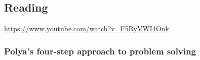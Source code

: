 



\subsection*{Reading}
\begin{center}
\begin{tcolorbox}[width=0.8\textwidth,colback={white},title={\textbf{Go and watch...}},colbacktitle=black,coltitle=white]
  \textcolor{black}{\url{https://www.youtube.com/watch?v=F5RyVWI4Onk}}
\end{tcolorbox}
\end{center}

\subsubsection*{Polya's four-step approach to problem solving}
